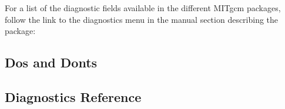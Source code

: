 

\newpage
\noindent For a list of the diagnostic fields available in the
different MITgcm packages, follow the link to the diagnostics menu
in the manual section describing the package:


\subsection{Dos and Donts}

\subsection{Diagnostics Reference}

